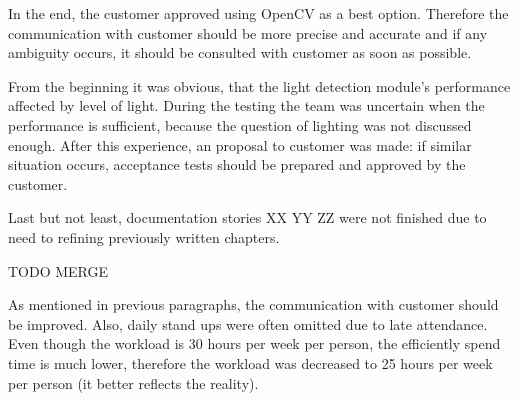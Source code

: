In the end, the customer approved using OpenCV as a best option.
Therefore the communication with customer should be more precise and accurate and if any ambiguity occurs, it should be consulted with customer as soon as possible.

From the beginning it was obvious, that the light detection module's performance affected by level of light.
During the testing the team was uncertain when the performance is sufficient, because the question of lighting was not discussed enough.
After this experience, an proposal to customer was made: if similar situation occurs, acceptance tests should be prepared and approved by the customer.

Last but not least, documentation stories XX YY ZZ were not finished due to need to refining previously written chapters.

TODO MERGE

As mentioned in previous paragraphs, the communication with customer should be improved.
Also, daily stand ups were often omitted due to late attendance.
Even though the workload is 30 hours per week per person, the efficiently spend time is much lower, therefore the workload was decreased to 25 hours per week per person (it better reflects the reality).
